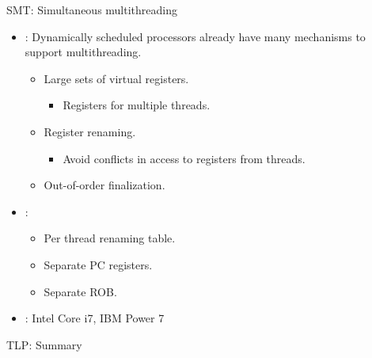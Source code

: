 \begin{frame}[t]{SMT: Simultaneous multithreading}
\begin{itemize}
  \item {}: 
        Dynamically scheduled processors already have many mechanisms
        to support multithreading.
    \begin{itemize}
      \item Large sets of virtual registers.
        \begin{itemize}
          \item Registers for multiple threads.
        \end{itemize}
      \item Register renaming.
        \begin{itemize}
          \item Avoid conflicts in access to registers from threads.
        \end{itemize}
      \item Out-of-order finalization.
    \end{itemize}

  \item {}:
    \begin{itemize}
      \item Per thread renaming table.
      \item Separate PC registers.
      \item Separate ROB.
    \end{itemize}

  \item {}: Intel Core i7, IBM Power 7

\end{itemize}
\end{frame}

\begin{frame}[t]{TLP: Summary}
\makebox[\textwidth][c]{

}
\end{frame}


